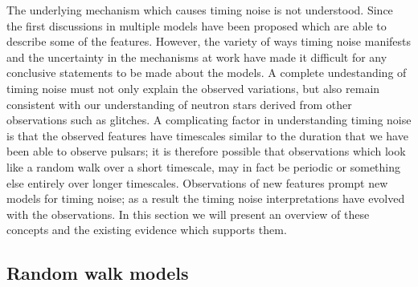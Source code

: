 The underlying mechanism which causes timing noise is not understood. Since the
first discussions in \citet{Boynton1972} multiple models have been proposed
which are able to describe some of the features. However, the variety of ways
timing noise manifests and the uncertainty in the mechanisms at work have made
it difficult for any conclusive statements to be made about the models. A
complete undestanding of timing noise must not only explain the observed
variations, but also remain consistent with our understanding of neutron stars
derived from other observations such as glitches. A complicating factor in
understanding timing noise is that the observed features have timescales
similar to the duration that we have been able to observe pulsars; it is
therefore possible that observations which look like a random walk over a short
timescale, may in fact be periodic or something else entirely over longer
timescales.  Observations of new features prompt new models for timing noise;
as a result the timing noise interpretations have evolved with the
observations. In this section we will present an overview of these concepts and
the existing evidence which supports them.

\subsection{Random walk models}
\label{sec: TN interpretations random walk models}

